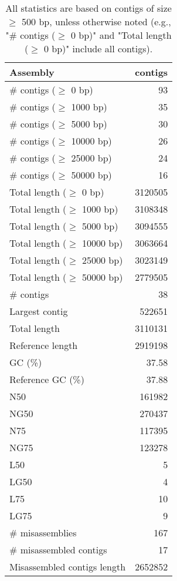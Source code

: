 \documentclass[12pt,a4paper]{article}
\begin{document}
\begin{table}[ht]
\begin{center}
\caption{All statistics are based on contigs of size $\geq$ 500 bp, unless otherwise noted (e.g., "\# contigs ($\geq$ 0 bp)" and "Total length ($\geq$ 0 bp)" include all contigs).}
\begin{tabular}{|l*{1}{|r}|}
\hline
Assembly & contigs \\ \hline
\# contigs ($\geq$ 0 bp) & 93 \\ \hline
\# contigs ($\geq$ 1000 bp) & 35 \\ \hline
\# contigs ($\geq$ 5000 bp) & 30 \\ \hline
\# contigs ($\geq$ 10000 bp) & 26 \\ \hline
\# contigs ($\geq$ 25000 bp) & 24 \\ \hline
\# contigs ($\geq$ 50000 bp) & 16 \\ \hline
Total length ($\geq$ 0 bp) & 3120505 \\ \hline
Total length ($\geq$ 1000 bp) & 3108348 \\ \hline
Total length ($\geq$ 5000 bp) & 3094555 \\ \hline
Total length ($\geq$ 10000 bp) & 3063664 \\ \hline
Total length ($\geq$ 25000 bp) & 3023149 \\ \hline
Total length ($\geq$ 50000 bp) & 2779505 \\ \hline
\# contigs & 38 \\ \hline
Largest contig & 522651 \\ \hline
Total length & 3110131 \\ \hline
Reference length & 2919198 \\ \hline
GC (\%) & 37.58 \\ \hline
Reference GC (\%) & 37.88 \\ \hline
N50 & 161982 \\ \hline
NG50 & 270437 \\ \hline
N75 & 117395 \\ \hline
NG75 & 123278 \\ \hline
L50 & 5 \\ \hline
LG50 & 4 \\ \hline
L75 & 10 \\ \hline
LG75 & 9 \\ \hline
\# misassemblies & 167 \\ \hline
\# misassembled contigs & 17 \\ \hline
Misassembled contigs length & 2652852 \\ \hline

\end{tabular}
\end{center}
\end{table}
\end{document}

